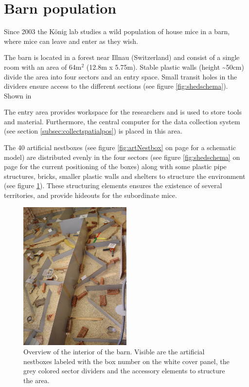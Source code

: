 \newpage
\section{Barn population}
\label{sec:shedsetup}

Since 2003 the K\"onig lab studies a wild population of house mice in a barn, where mice can leave and enter as they wish.

The barn is located in a forest near Illnau (Switzerland) and consist of a single room with an area of 64m$^2$ (12.8m x 5.75m). Stable plastic walls (height \textasciitilde50cm) divide the area into four sectors and an entry space. Small transit holes in the dividers ensure access to the different sections (see figure \ref{fig:shedschema}). Shown in 

The entry area provides workspace for the researchers and is used to store tools and material. Furthermore, the central computer for the data collection system (see section \ref{subsec:collectspatialpos}) is placed in this area.

The 40 artificial nestboxes (see figure \ref{fig:artNestbox} on page \pageref{fig:artNestbox} for a schematic model) are distributed evenly in the four sectors (see figure \ref{fig:shedschema} on page \pageref{fig:shedschema} for the current positioning of the boxes) along with some plastic pipe structures, bricks, smaller plastic walls and shelters to structure the environment (see figure \ref{fig:shedoverview}). These structuring elements ensures the existence of several territories, and provide hideouts for the subordinate mice.

\begin{figure}[htpb]
\begin{center}
  \includegraphics[width=0.5\textwidth]{assets/pdf/shed_overview.pdf}
  \caption[Interior of the barn]{Overview of the interior of the barn. Visible are the artificial nestboxes labeled with the box number on the white cover panel, the grey colored sector dividers and the accessory elements to structure the area.}
  \label{fig:shedoverview}
\end{center}
\end{figure}

